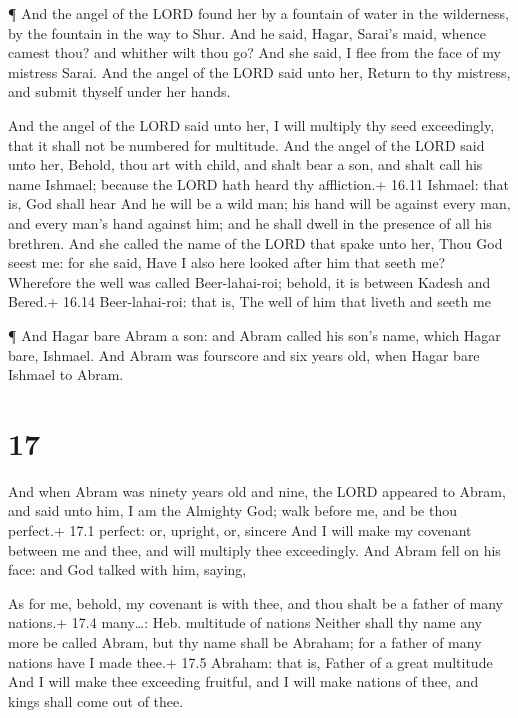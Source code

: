  ¶ And the angel of the LORD found her by a fountain of
water in the wilderness, by the fountain in the way to Shur.
 And he said, Hagar, Sarai's maid, whence camest thou? and
whither wilt thou go? And she said, I flee from the face of my mistress
Sarai.  And the angel of the LORD said unto her, Return to
thy mistress, and submit thyself under her hands.

 And the angel of the LORD said unto her, I will multiply
thy seed exceedingly, that it shall not be numbered for multitude.
 And the angel of the LORD said unto her, Behold, thou art
with child, and shalt bear a son, and shalt call his name Ishmael;
because the LORD hath heard thy affliction.+ 16.11 Ishmael: that is, God
shall hear  And he will be a wild man; his hand will be
against every man, and every man's hand against him; and he shall dwell
in the presence of all his brethren.  And she called the
name of the LORD that spake unto her, Thou God seest me: for she said,
Have I also here looked after him that seeth me?  Wherefore
the well was called Beer-lahai-roi; behold, it is between Kadesh and
Bered.+ 16.14 Beer-lahai-roi: that is, The well of him that liveth and
seeth me

 ¶ And Hagar bare Abram a son: and Abram called his son's
name, which Hagar bare, Ishmael.  And Abram was fourscore
and six years old, when Hagar bare Ishmael to Abram.

\hypertarget{section-16}{%
\section{17}\label{section-16}}

 And when Abram was ninety years old and nine, the LORD
appeared to Abram, and said unto him, I am the Almighty God; walk before
me, and be thou perfect.+ 17.1 perfect: or, upright, or, sincere
 And I will make my covenant between me and thee, and will
multiply thee exceedingly.  And Abram fell on his face: and
God talked with him, saying,

 As for me, behold, my covenant is with thee, and thou shalt
be a father of many nations.+ 17.4 many\ldots: Heb. multitude of nations
 Neither shall thy name any more be called Abram, but thy
name shall be Abraham; for a father of many nations have I made thee.+
17.5 Abraham: that is, Father of a great multitude  And I
will make thee exceeding fruitful, and I will make nations of thee, and
kings shall come out of thee.

